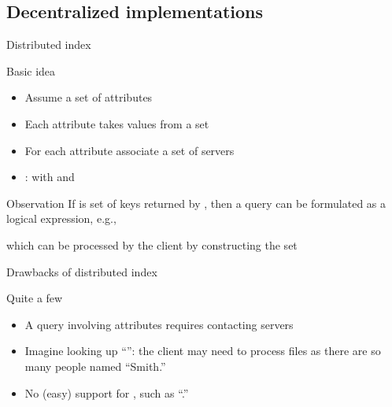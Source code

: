 \subsection{Decentralized implementations}
\begin{slide}{Distributed index}
  \begin{block}{Basic idea}
    \begin{itemize}\tightlist
    \item Assume a set of attributes 
    \item Each attribute  takes values from a set 
    \item For each attribute  associate a set  of  servers
    \item {} :  with
       and 
    \end{itemize}
  \end{block}
  \begin{block}{Observation}
    If  is set of keys returned by , then
    a query can be formulated as a logical expression, e.g.,
    \begin{quote}
    \end{quote}
    which can be processed by the client by constructing the set
    \begin{quote}
    \end{quote}
  \end{block}
\end{slide}
\begin{slide}{Drawbacks of distributed index}
  \begin{block}{Quite a few}
    \begin{itemize}
    \item A query involving  attributes requires contacting  servers
    \item Imagine looking up ``'': the
      client may need to process  files as there are so many people named ``Smith.''
    \item No (easy) support for , such as ``.''
    \end{itemize}
  \end{block}
\end{slide}
